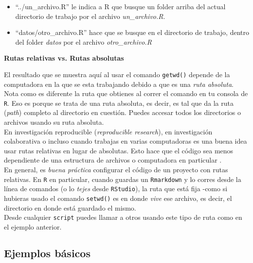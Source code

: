 \documentclass[]{article}
\providecommand{\tightlist}{%
  \setlength{\itemsep}{0pt}\setlength{\parskip}{0pt}}
\begin{document}
\begin{itemize}
\tightlist
\item
  ``../un\_archivo.R'' le indica a R que busque un folder arriba del
  actual directorio de trabajo por el archivo \emph{un\_archivo.R}.
\item
  ``datos/otro\_archivo.R'' hace que se busque en el directorio de
  trabajo, dentro del folder \emph{datos} por el archivo
  \emph{otro\_archivo.R}
\end{itemize}

\begin{nota}
\textbf{Rutas relativas vs. Rutas absolutas\\}

El resultado que se muestra aquí al usar el comando \texttt{getwd()} depende de la computadora en la que se esta 
trabajando debido a que es una \textit{ruta absoluta}. Nota como es diferente la ruta 
que obtienes al correr el comando en tu consola de \texttt{R}. Eso es porque se trata 
de una ruta absoluta, es decir, es tal que da la ruta (\textit{path}) completo
al directorio en cuestión. Puedes accesar todos los directorios o archivos usando su ruta absoluta.\\

En investigación reproducible (\textit{reproducible research}), en investigación colaborativa o
incluso cuando trabajas en varias computadoras es una buena idea usar rutas relativas
en lugar de absolutas. Esto hace que el código sea menos dependiente de una estructura
de archivos o computadora en particular \parencite[][p. 67]{gandrud2013}. \\

En general, es \textit{buena práctica} configurar el código de un proyecto con rutas relativas.
En \texttt{R} en particular, cuando guardas un \texttt{Rmarkdown} y lo corres desde la línea de
comandos (o lo \textit{tejes} desde \texttt{RStudio}), la ruta que está fija -como si hubieras usado el comando \texttt{setwd()} es
en donde \textit{vive} ese archivo, es decir, el directorio en donde está guardado el mismo.\\

Desde cualquier \texttt{script} puedes llamar a otros usando este tipo de ruta como en 
el ejemplo anterior.
\end{nota}

\subsection{Ejemplos básicos}\label{ejemplos-basicos}
\end{document}

